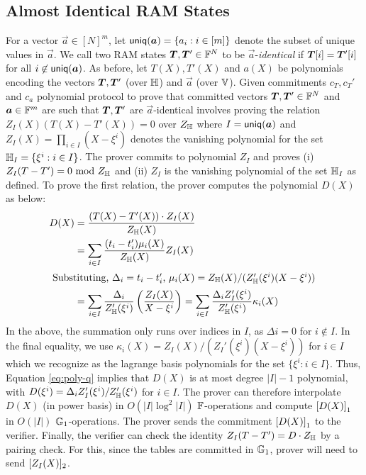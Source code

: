 \subsection{Almost Identical RAM States}\label{subsec:proximity-ram}
For a vector $\vec{a}\in [N]^m$, let $\uniq{a}=\{a_i: i\in [m]\}$ denote the subset of unique values in $\vec{a}$. We call two
RAM states $\vecT, \vecT'\in \F^N$ to be $\vec{a}$-{\em identical} if $\vecT[i]=\vecT'[i]$ for all $i\not\in\uniq{a}$. As before,
let $T(X),T'(X)$ and $a(X)$ be polynomials encoding the vectors $\vecT,\vecT'$ (over $\mathbb{H}$) and $\vec{a}$ (over $\mathbb{V}$). Given
commitments $c_T, c_T'$ and $c_a$ polynomial protocol to prove that committed vectors $\vecT,\vecT'\in \F^N$ and $\vec{a}\in \F^m$
are such that $\vecT,\vecT'$ are $\vec{a}$-identical involves proving the relation $Z_I(X)(T(X) - T'(X)) = 0$ over $Z_{\mathbb{H}}$ where
$I=\uniq{a}$ and $Z_I(X)=\prod_{i\in I}(X-\xi^i)$ denotes the vanishing polynomial for the set $\mathbb{H}_I=\{\xi^i: i\in I\}$.
The prover commits to polynomial $Z_I$ and proves (i) $Z_I(T - T') = 0 \text{ mod } Z_{\mathbb{H}}$ and (ii) $Z_I$ is the vanishing
polynomial of the set $\mathbb{H}_I$ as defined. To prove the first relation, the prover computes the polynomial $D(X)$ as below:
\begin{align}\label{eq:poly-q}
D(X) &= \frac{(T(X)-T'(X))\cdot Z_I(X)}{Z_{\mathbb{H}}(X)} \nonumber \\
&= \sum_{i\in I}\frac{(t_i - t_i')\mu_i(X)}{Z_{\mathbb{H}}(X)} Z_I(X) \nonumber \\
\intertext{ Substituting, $\Delta_i=t_i-t_i'$, $\mu_i(X)=Z_\mathbb{H}(X)/(Z_\mathbb{H}'(\xi^i)(X-\xi^i))$ }
&=\sum_{i\in I}\frac{\Delta_i}{Z_{\mathbb{H}}'(\xi^i)}\left(\frac{Z_I(X)}{X-\xi^i}\right) = \sum_{i\in I}\frac{\Delta_i Z_I'(\xi^i)}{Z_{\mathbb{H}}'(\xi^i)}\kappa_i(X)
\end{align}
In the above, the summation only runs over indices in $I$, as $\Delta i = 0$ for $i\not\in I$. In the final equality, we use
$\kappa_i(X) = Z_I(X)/(Z_I'(\xi^i)(X-\xi^i))$ for $i\in I$ which we recognize as the lagrange basis polynomials for the set
$\{\xi^i: i\in I\}$. Thus, Equation \eqref{eq:poly-q} implies that $D(X)$ is at most degree $|I|-1$ polynomial, with
$D(\xi^i)=\Delta_i Z_I'(\xi^i)/Z_\mathbb{H}'(\xi^i)$ for $i\in I$.
The prover can therefore interpolate $D(X)$ (in power basis)
in $O(|I|\log^2 |I|)$ $\mathbb{F}$-operations and compute $\left[{D(X)}\right]_1$ in $O(|I|)$ $\mathbb{G}_1$-operations. The prover sends the
commitment $\left[{D(X)}\right]_1$ to the verifier. Finally, the verifier can
check the identity $Z_I(T - T') = D\cdot Z_{\mathbb{H}}$ by a pairing check. For this, since the tables are committed in $\mathbb{G}_1$, prover will need to send $[Z_I(X)]_2$.

